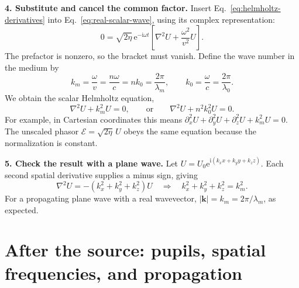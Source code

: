 \documentclass[11pt,a4paper]{article}
\numberwithin{equation}{section}
\newcommand{\ii}{\mathrm{i}}
\newcommand{\ee}{\mathrm{e}}
\newcommand{\vct}[1]{\bm{#1}}
\begin{document}
\textbf{4. Substitute and cancel the common factor.}
Insert Eq.~\eqref{eq:helmholtz-derivatives} into
Eq.~\eqref{eq:real-scalar-wave}, using its complex representation:
\[
0=\sqrt{2\eta}\,\ee^{-\ii\omega t}
\left[\nabla^2U+\frac{\omega^2}{v^2}U\right].
\]
The prefactor is nonzero, so the bracket must vanish. Define the
wave number in the medium by
\begin{equation}
k_m=\frac{\omega}{v}=\frac{n\omega}{c}
=nk_0=\frac{2\pi}{\lambda_m},\qquad
k_0=\frac{\omega}{c}=\frac{2\pi}{\lambda_0}.
\end{equation}
We obtain the scalar Helmholtz equation,
\begin{equation}
\boxed{\nabla^2U+k_m^2U=0,\qquad\text{or}\qquad
\nabla^2U+n^2k_0^2U=0.}
\label{eq:scalar-helmholtz}
\end{equation}
For example, in Cartesian coordinates this means
$\partial_x^2U+\partial_y^2U+\partial_z^2U+k_m^2U=0$.
The unscaled phasor $\mathcal E=\sqrt{2\eta}\,U$ obeys the same
equation because the normalization is constant.

\textbf{5. Check the result with a plane wave.}
Let $U=U_0\ee^{\ii(k_xx+k_yy+k_zz)}$. Each second spatial derivative
supplies a minus sign, giving
\begin{equation}
\nabla^2U=-(k_x^2+k_y^2+k_z^2)U
\quad\Longrightarrow\quad
k_x^2+k_y^2+k_z^2=k_m^2.
\label{eq:helmholtz-plane-wave-check}
\end{equation}
For a propagating plane wave with a real wavevector,
$|\vct k|=k_m=2\pi/\lambda_m$, as expected. 



\section{After the source: pupils, spatial frequencies, and propagation}
\end{document}
